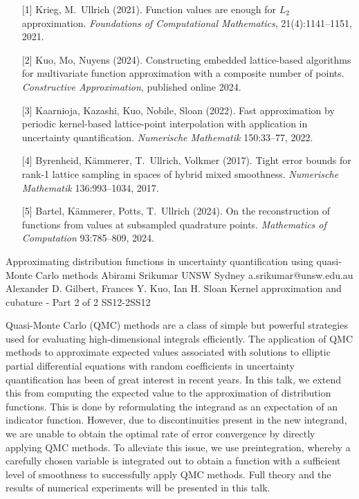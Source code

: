 \begin{talk}
\begin{enumerate}
	\item[{[1]}] Krieg, M.~Ullrich (2021). Function values are enough for $L_2$ approximation. {\it Foundations of Computational Mathematics}, 21(4):1141--1151, 2021.
    \item[{[2]}] Kuo, Mo, Nuyens (2024). Constructing embedded lattice-based algorithms for multivariate function approximation with a composite number of points. {\it Constructive Approximation}, published online 2024.
    \item[{[3]}] Kaarnioja, Kazashi, Kuo, Nobile, Sloan (2022). Fast approximation by periodic kernel-based lattice-point interpolation with application in uncertainty quantification. {\it Numerische Mathematik} 150:33--77, 2022.
    \item[{[4]}] Byrenheid, K{\"a}mmerer, T.~Ullrich, Volkmer (2017). Tight error bounds for rank-1 lattice sampling in spaces of hybrid mixed smoothness. {\it Numerische Mathematik} 136:993–1034, 2017.
    \item[{[5]}] Bartel, K{\"a}mmerer, Potts, T.~Ullrich (2024). On the reconstruction of functions from values at subsampled quadrature points. {\it Mathematics of Computation} 93:785--809, 2024.
\end{enumerate}


\end{talk}

\begin{talk}
  {Approximating distribution functions in uncertainty quantification using quasi-Monte
Carlo methods}%
  {Abirami Srikumar}%
  {UNSW Sydney}%
  {a.srikumar@unsw.edu.au}%
  {Alexander D. Gilbert, Frances Y. Kuo, Ian H. Sloan}%
{Kernel approximation and cubature - Part 2 of 2}
{}{SS12-2}{SS12}

			
Quasi-Monte Carlo (QMC) methods are a class of simple but powerful strategies used for evaluating high-dimensional integrals efficiently. The application of QMC methods to approximate expected values associated with solutions to elliptic partial differential equations with random coefficients in uncertainty quantification has been of great interest in recent years. In this talk, we extend this from computing the expected value to the approximation of distribution functions. This is done by reformulating the integrand as an expectation of an indicator function. However, due to discontinuities present in the new integrand, we are unable to obtain the optimal rate of error convergence by directly applying QMC methods. To alleviate this issue, we use preintegration, whereby a carefully chosen variable is integrated out to obtain a function with a sufficient level of smoothness to successfully apply  QMC methods. Full theory and the results of numerical experiments will be presented in this talk.  


\end{talk}

